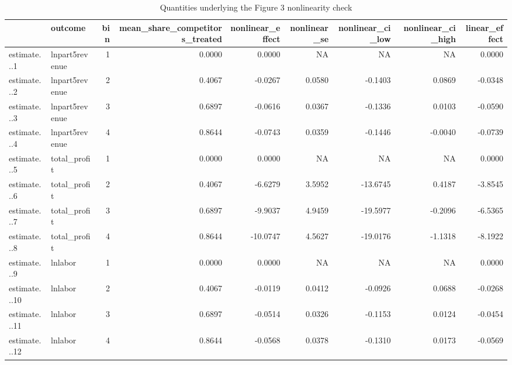 \begin{table}

\caption{Quantities underlying the Figure 3 nonlinearity check}
\centering
\begin{tabular}[t]{llrrrrrrr}
\toprule
  & outcome & bin & mean\_share\_competitors\_treated & nonlinear\_effect & nonlinear\_se & nonlinear\_ci\_low & nonlinear\_ci\_high & linear\_effect\\
\midrule
estimate...1 & lnpart5revenue & 1 & 0.0000 & 0.0000 & NA & NA & NA & 0.0000\\
estimate...2 & lnpart5revenue & 2 & 0.4067 & -0.0267 & 0.0580 & -0.1403 & 0.0869 & -0.0348\\
estimate...3 & lnpart5revenue & 3 & 0.6897 & -0.0616 & 0.0367 & -0.1336 & 0.0103 & -0.0590\\
estimate...4 & lnpart5revenue & 4 & 0.8644 & -0.0743 & 0.0359 & -0.1446 & -0.0040 & -0.0739\\
estimate...5 & total\_profit & 1 & 0.0000 & 0.0000 & NA & NA & NA & 0.0000\\
\addlinespace
estimate...6 & total\_profit & 2 & 0.4067 & -6.6279 & 3.5952 & -13.6745 & 0.4187 & -3.8545\\
estimate...7 & total\_profit & 3 & 0.6897 & -9.9037 & 4.9459 & -19.5977 & -0.2096 & -6.5365\\
estimate...8 & total\_profit & 4 & 0.8644 & -10.0747 & 4.5627 & -19.0176 & -1.1318 & -8.1922\\
estimate...9 & lnlabor & 1 & 0.0000 & 0.0000 & NA & NA & NA & 0.0000\\
estimate...10 & lnlabor & 2 & 0.4067 & -0.0119 & 0.0412 & -0.0926 & 0.0688 & -0.0268\\
\addlinespace
estimate...11 & lnlabor & 3 & 0.6897 & -0.0514 & 0.0326 & -0.1153 & 0.0124 & -0.0454\\
estimate...12 & lnlabor & 4 & 0.8644 & -0.0568 & 0.0378 & -0.1310 & 0.0173 & -0.0569\\
\bottomrule
\end{tabular}
\end{table}
